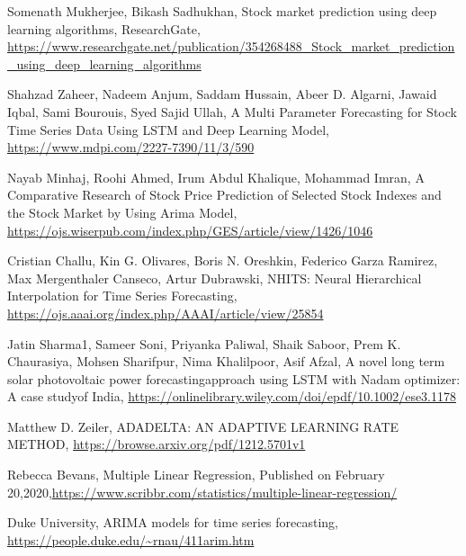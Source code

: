 \documentclass{ieeeojies}
\begin{document}
\begin{thebibliography}{00}
    Somenath Mukherjee, 
    Bikash Sadhukhan,
    Stock market prediction using deep learning algorithms,
    ResearchGate,   \url{https://www.researchgate.net/publication/354268488_Stock_market_prediction_using_deep_learning_algorithms}
    
    Shahzad Zaheer, 
    Nadeem Anjum,
    Saddam Hussain, 
    Abeer D. Algarni, 
    Jawaid Iqbal, 
    Sami Bourouis,
    Syed Sajid Ullah,
    A Multi Parameter Forecasting for Stock Time Series Data Using LSTM and Deep Learning Model,
    \url{https://www.mdpi.com/2227-7390/11/3/590}

    Nayab Minhaj, Roohi Ahmed, Irum Abdul Khalique, Mohammad Imran,
    A  Comparative  Research  of  Stock  Price  Prediction  of  Selected  Stock  Indexes and the Stock Market by Using Arima Model, \url{https://ojs.wiserpub.com/index.php/GES/article/view/1426/1046}

    Cristian Challu,
    Kin G. Olivares,
    Boris N. Oreshkin,
    Federico Garza Ramirez,
    Max Mergenthaler Canseco,
    Artur Dubrawski,
    NHITS: Neural Hierarchical Interpolation for Time Series Forecasting,
    \url{https://ojs.aaai.org/index.php/AAAI/article/view/25854}

    Jatin Sharma1,
    Sameer Soni,
    Priyanka Paliwal,
    Shaik Saboor,
    Prem K. Chaurasiya,
    Mohsen Sharifpur,
    Nima Khalilpoor,
    Asif Afzal,
    A novel long term solar photovoltaic power forecastingapproach using LSTM with Nadam optimizer: A case studyof India,
    \url{https://onlinelibrary.wiley.com/doi/epdf/10.1002/ese3.1178}

    Matthew D. Zeiler,
    ADADELTA: AN ADAPTIVE LEARNING RATE METHOD, 
    \url{https://browse.arxiv.org/pdf/1212.5701v1}
    
    Rebecca Bevans,
    Multiple Linear Regression, 
    Published on February 20,2020,\url{https://www.scribbr.com/statistics/multiple-linear-regression/}

    Duke University,
    ARIMA models for time series forecasting, 
    \url{https://people.duke.edu/~rnau/411arim.htm}

\end{thebibliography}

\EOD
\end{document}
